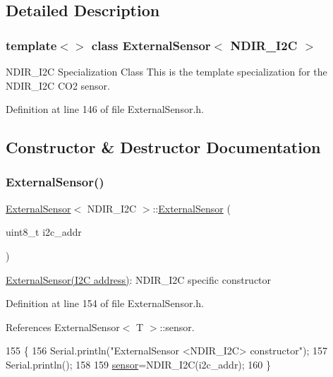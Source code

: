 \subsection{Detailed Description}
\subsubsection*{template$<$$>$\newline
class External\+Sensor$<$ N\+D\+I\+R\+\_\+\+I2\+C $>$}

N\+D\+I\+R\+\_\+\+I2C Specialization Class This is the template specialization for the N\+D\+I\+R\+\_\+\+I2C C\+O2 sensor. 

Definition at line 146 of file External\+Sensor.\+h.



\subsection{Constructor \& Destructor Documentation}
\mbox{\label{classExternalSensor_3_01NDIR__I2C_01_4_aa06970ea689679c0e1deb5360e05a0a4}} 
\subsubsection{\texorpdfstring{External\+Sensor()}{ExternalSensor()}}
{\footnotesize\ttfamily \hyperlink{classExternalSensor}{External\+Sensor}$<$ N\+D\+I\+R\+\_\+\+I2C $>$\+::\hyperlink{classExternalSensor}{External\+Sensor} (\begin{DoxyParamCaption}\item[{uint8\+\_\+t}]{i2c\+\_\+addr }\end{DoxyParamCaption})\hspace{0.3cm}{\ttfamily [inline]}}

\hyperlink{classExternalSensor}{External\+Sensor(\+I2\+C address)}\+: N\+D\+I\+R\+\_\+\+I2C specific constructor 

Definition at line 154 of file External\+Sensor.\+h.



References External\+Sensor$<$ T $>$\+::sensor.


\begin{DoxyCode}
155     \{
156         Serial.println(\textcolor{stringliteral}{"ExternalSensor <NDIR\_I2C> constructor"});
157         Serial.println();
158 
159         \hyperlink{classExternalSensor_3_01NDIR__I2C_01_4_ae541c9cece7c38674b70114cdb74a7dc}{sensor}=NDIR\_I2C(i2c\_addr);
160     \}
\end{DoxyCode}



